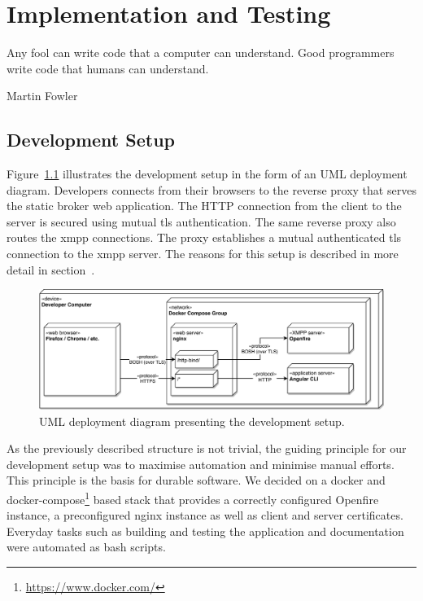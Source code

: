 \chapter{Implementation and Testing} %
\epigraph{Any fool can write code that a computer can understand. Good programmers write code that humans can understand.}{Martin Fowler}


\section{Development Setup}\label{sec:development-setup}

Figure~\ref{fig:development-setup} illustrates the development setup in the form of an UML deployment diagram.
Developers connects from their browsers to the reverse proxy that serves the static \gls{broker} web application.
The HTTP connection from the client to the server is secured using mutual \gls{tls} authentication.
The same reverse proxy also routes the \gls{xmpp} connections.
The proxy establishes a mutual authenticated \gls{tls} connection to the \gls{xmpp} server.
The reasons for this setup is described in more detail in section~.

\begin{figure}[h]
    \centering
    \includegraphics[width=1\linewidth]{resources/development-setup-uml}
    \caption{UML deployment diagram presenting the development setup.}
    \label{fig:development-setup}
\end{figure}

As the previously described structure is not trivial, the guiding principle for our development setup was to maximise automation and minimise manual efforts.
This principle is the basis for durable software.
We decided on a docker and docker-compose\footnote{\url{https://www.docker.com/}} based stack that provides a correctly configured Openfire instance, a preconfigured nginx instance as well as client and server certificates.
Everyday tasks such as building and testing the application and documentation were automated as bash scripts.

